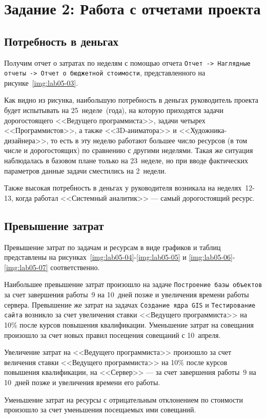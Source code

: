\section{Задание 2: Работа с отчетами проекта}

\subsection{Потребность в деньгах}

Получим отчет о затратах по неделям с помощью отчета \texttt{Отчет -> Наглядные отчеты -> Отчет о бюджетной стоимости}, представленного на рисунке~\ref{img:lab05-03}.


Как видно из рисунка, наибольшую потребность в деньгах руководитель проекта будет испытывать на 25~неделе~(года), на которую приходятся задачи дорогостоящего <<Ведущего программиста>>, задачи четырех <<Программистов>>, а также <<3D-аниматора>> и <<Художника-дизайнера>>, то есть в эту неделю работают большее число ресурсов (в том числе и дорогостоящих) по сравнению с другими неделями. Такая же ситуация наблюдалась в базовом плане только на 23~неделе, но при вводе фактических параметров данные задачи сместились на 2~недели.

Также высокая потребность в деньгах у руководителя возникала на неделях~12-13, когда работал <<Системный аналитик>> --- самый дорогостоящий ресурс.

\subsection{Превышение затрат}

Превышение затрат по задачам и ресурсам в виде графиков и таблиц представлены на рисунках~\ref{img:lab05-04}-\ref{img:lab05-05} и \ref{img:lab05-06}-\ref{img:lab05-07} соответственно.

Наибольшее превышение затрат произошло на задаче \texttt{Построение базы объектов} за счет завершения работы~9 на 10~дней позже и увеличения времени работы сервера. Превышение же затрат на задачах \texttt{Создание ядра GIS} и \texttt{Тестирование сайта} возникло за счет увеличения ставки <<Ведущего программиста>> на 10\% после курсов повышения квалификации. Уменьшение затрат на совещания произошло за счет новых правил посещения совещаний с 10~апреля.



Увеличение затрат на <<Ведущего программиста>> произошло за счет величения ставки <<Ведущего программиста>> на 10\% после курсов повышения квалификации, на <<Сервер>> --- за счет завершения работы~9 на 10~дней позже и увеличения времени его работы.

Уменьшение затрат на ресурсы с отрицательным отклонением по стоимости произошло за счет уменьшения посещаемых ими совещаний.


